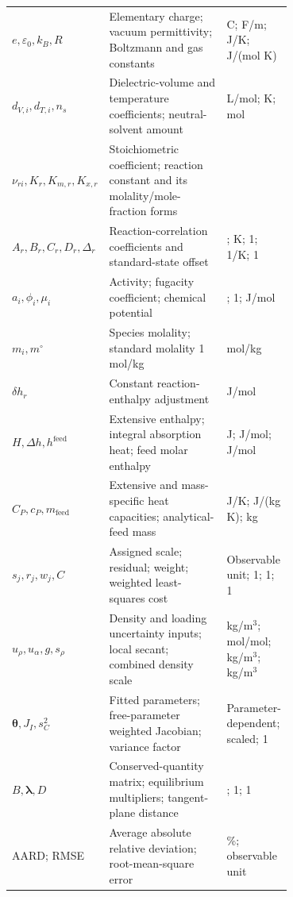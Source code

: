 \begin{table}[pos=!htbp]
\begin{tabular}{@{}l>{\raggedright\arraybackslash}p{0.4800\linewidth}>{\raggedright\arraybackslash}p{0.2200\linewidth}@{}}
$e,\varepsilon_0,k_B,R$ & Elementary charge; vacuum permittivity; Boltzmann and gas constants & C; F/\allowbreak{}m; J/\allowbreak{}K; J/\allowbreak{}(mol K) \\
$d_{V,i},d_{T,i},n_s$ & Dielectric-volume and temperature coefficients; neutral-solvent amount & L/\allowbreak{}mol; K; mol \\
$\nu_{ri},K_r,K_{m,r},K_{x,r}$ & Stoichiometric coefficient; reaction constant and its molality/\allowbreak{}mole-fraction forms & 1 \\
$A_r,B_r,C_r,D_r,\Delta_r$ & Reaction-correlation coefficients and standard-state offset & 1; K; 1; 1/\allowbreak{}K; 1 \\
$a_i,\phi_i,\mu_i$ & Activity; fugacity coefficient; chemical potential & 1; 1; J/\allowbreak{}mol \\
$m_i,m^\circ$ & Species molality; standard molality 1 mol/\allowbreak{}kg & mol/\allowbreak{}kg \\
$\delta h_r$ & Constant reaction-enthalpy adjustment & J/\allowbreak{}mol \\
$H,\Delta h,h^{\mathrm{feed}}$ & Extensive enthalpy; integral absorption heat; feed molar enthalpy & J; J/\allowbreak{}mol; J/\allowbreak{}mol \\
$C_P,c_P,m_{\mathrm{feed}}$ & Extensive and mass-specific heat capacities; analytical-feed mass & J/\allowbreak{}K; J/\allowbreak{}(kg K); kg \\
$s_j,r_j,w_j,C$ & Assigned scale; residual; weight; weighted least-squares cost & Observable unit; 1; 1; 1 \\
$u_\rho,u_\alpha,g,s_\rho$ & Density and loading uncertainty inputs; local secant; combined density scale & kg/\allowbreak{}m$^3$; mol/\allowbreak{}mol; kg/\allowbreak{}m$^3$; kg/\allowbreak{}m$^3$ \\
$\boldsymbol\theta,J_I,s_C^2$ & Fitted parameters; free-parameter weighted Jacobian; variance factor & Parameter-dependent; scaled; 1 \\
$B,\boldsymbol\lambda,D$ & Conserved-quantity matrix; equilibrium multipliers; tangent-plane distance & 1; 1; 1 \\
AARD; RMSE & Average absolute relative deviation; root-mean-square error & \%; observable unit \\
\bottomrule
\end{tabular}
\end{table}
